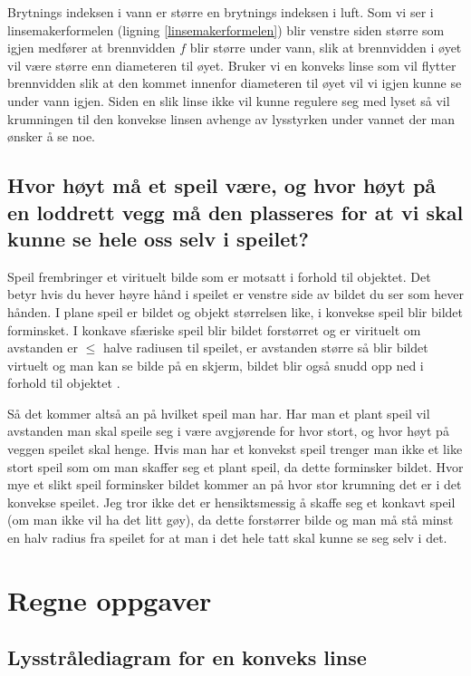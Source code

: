 \documentclass[a4paper,12pt,norsk]{article}
\begin{document}
Brytnings indeksen i vann er større en brytnings indeksen i luft. Som vi ser i linsemakerformelen (ligning \vref{linsemakerformelen}) blir venstre siden større som igjen medfører at brennvidden $f$ blir større under vann, slik at brennvidden i øyet vil være større enn diameteren til øyet. Bruker vi en konveks linse som vil flytter brennvidden slik at den kommet innenfor diameteren til øyet vil vi igjen kunne se under vann igjen. Siden en slik linse ikke vil kunne regulere seg med lyset så vil krumningen til den konvekse linsen avhenge av lysstyrken under vannet der man ønsker å se noe.

\subsection{Hvor høyt må et speil være, og hvor høyt på en loddrett vegg må den plasseres for at vi skal kunne se hele oss selv i speilet?}
Speil frembringer et virituelt bilde som er motsatt i forhold til objektet. Det betyr hvis du hever høyre hånd i speilet er venstre side av bildet du ser som hever hånden. I plane speil er bildet og objekt størrelsen like, i konvekse speil blir bildet forminsket. I konkave sfæriske speil blir bildet forstørret og er virituelt om avstanden er $\leq $ halve radiusen til speilet, er avstanden større så blir bildet virtuelt og man kan se bilde på en skjerm, bildet blir også snudd opp ned i forhold til objektet \cite{snl}.

Så det kommer altså an på hvilket speil man har. Har man et plant speil vil avstanden man skal speile seg i være avgjørende for hvor stort, og hvor høyt på veggen speilet skal henge. Hvis man har et konvekst speil trenger man ikke et like stort speil som om man skaffer seg et plant speil, da dette forminsker bildet. Hvor mye et slikt speil forminsker bildet kommer an på hvor stor krumning det er i det konvekse speilet. Jeg tror ikke det er hensiktsmessig å skaffe seg et konkavt speil (om man ikke vil ha det litt gøy), da dette forstørrer bilde og man må stå minst en halv radius fra speilet for at man i det hele tatt skal kunne se seg selv i det. 



\section{Regne oppgaver}

\subsection{Lysstrålediagram for en konveks linse}
\end{document}
